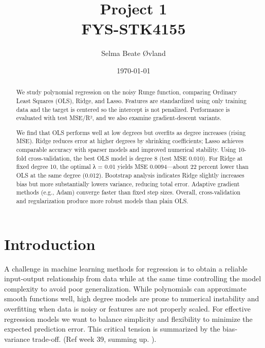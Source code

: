 \documentclass[amssymb,twocolumn,aps]{revtex4}
\begin{document}
	
\title{Project 1 \\
    \normalsize FYS-STK4155}
\date{\today}               
\author{Selma Beate Øvland}

\newpage
	
\begin{abstract}

We study polynomial regression on the noisy Runge function, comparing Ordinary Least Squares (OLS), Ridge, and Lasso. Features are standardized using only training data and the target is centered so the intercept is not penalized. Performance is evaluated with test MSE/R², and we also examine gradient-descent variants.

We find that OLS performs well at low degrees but overfits as degree increases (rising MSE). Ridge reduces error at higher degrees by shrinking coefficients; Lasso achieves comparable accuracy with sparser models and improved numerical stability. Using 10-fold cross-validation, the best OLS model is degree 8 (test MSE 0.010). For Ridge at fixed degree 10, the optimal λ = 0.01 yields MSE 0.0094—about 22 percent lower than OLS at the same degree (0.012). Bootstrap analysis indicates Ridge slightly increases bias but more substantially lowers variance, reducing total error. Adaptive gradient methods (e.g., Adam) converge faster than fixed step sizes. Overall, cross-validation and regularization produce more robust models than plain OLS.

\end{abstract}


\maketitle

\section{Introduction}
A challenge in machine learning methods for regression is to obtain a reliable input-output relationship from data while at the same time controlling the model complexity to avoid poor generalization. While polynomials can approximate smooth functions well, high degree models are prone to numerical instability and overfitting when data is noisy or features are not properly scaled. For effective regression models we want to balance simplicity and flexibility to minimize the expected prediction error. This critical tension is summarized by the bias-variance trade-off. (Ref week 39, summing up. ). \\
\end{document}
